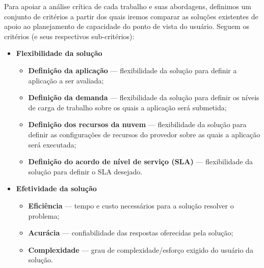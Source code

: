 Para apoiar a análise crítica de cada trabalho e suas abordagens, definimos um conjunto de critérios a partir dos quais iremos comparar as soluções existentes de apoio ao planejamento de capacidade do ponto de vista do usuário. Seguem os critérios (e seus respectivos sub-critérios):

\begin{itemize}
  \item \textbf{Flexibilidade da solução}
  \begin{itemize}
    \item \textbf{Definição da aplicação} --- flexibilidade da solução para
    definir a aplicação a ser avaliada;
    \item \textbf{Definição da demanda} --- flexibilidade da solução para
    definir os níveis de carga de trabalho sobre os quais a aplicação será
    submetida;
	\item \textbf{Definição dos recursos da nuvem} --- flexibilidade da solução
	para definir as configurações de recursos do provedor sobre as quais a aplicação
	será executada;
	\item \textbf{Definição do acordo de nível de serviço (SLA)} --- flexibilidade
	da solução para definir o SLA desejado.
  \end{itemize}
  \item \textbf{Efetividade da solução}  
  \begin{itemize}
    \item \textbf{Eficiência} --- tempo e custo necessários para a solução
    resolver o problema;
    \item \textbf{Acurácia} --- confiabilidade das respostas oferecidas pela
    solução;
	\item \textbf{Complexidade} --- grau de complexidade/esforço exigido do usuário
	da solução.
  \end{itemize}
\end{itemize}


